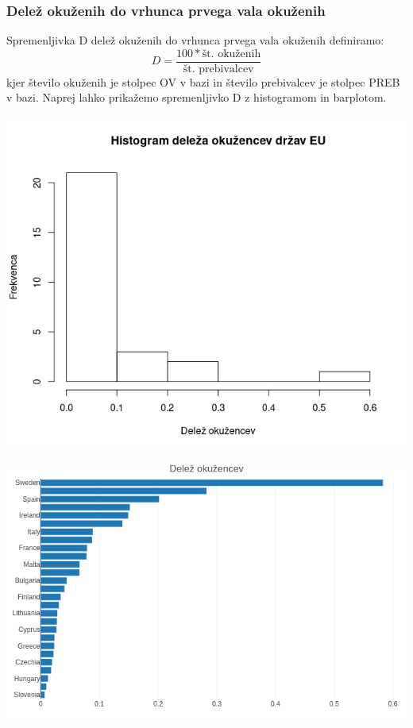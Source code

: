 \documentclass[a4paper,11pt]{article}
\begin{document}
\subsubsection{Delež okuženih do vrhunca prvega vala okuženih}
Spremenljivka D delež okuženih do vrhunca prvega vala okuženih definiramo:
\[D = \frac{100 * \text{št. okuženih}}{\text{št. prebivalcev}}\]
kjer število okuženih je stolpec OV v bazi in število prebivalcev je stolpec PREB v bazi. Naprej lahko prikažemo spremenljivko D z histogramom in barplotom.\\
\begin{center}
\includegraphics[scale=0.6]{histogram_delez_okuzenih}\\
\end{center}
\begin{center}
\includegraphics[scale=0.6]{barplot_delez_okuzenih}\\
\end{center}
\end{document}
